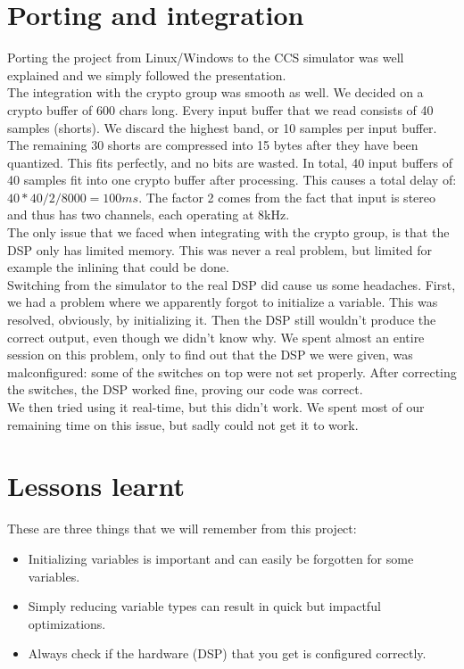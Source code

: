 \documentclass[a4paper]{article}
\begin{document}
\section{Porting and integration}
Porting the project from Linux/Windows to the CCS simulator was well explained and we simply followed the presentation. \\

The integration with the crypto group was smooth as well. We decided on a crypto buffer of 600 chars long. Every input buffer that we read consists of 40 samples (shorts). We discard the highest band, or 10 samples per input buffer. The remaining 30 shorts are compressed into 15 bytes after they have been quantized. This fits perfectly, and no bits are wasted. In total, 40 input buffers of 40 samples fit into one crypto buffer after processing. This causes a total delay of: $40*40/2/8000 = 100ms$. The factor 2 comes from the fact that input is stereo and thus has two channels, each operating at 8kHz. \\
The only issue that we faced when integrating with the crypto group, is that the DSP only has limited memory. This was never a real problem, but limited for example the inlining that could be done. \\
Switching from the simulator to the real DSP did cause us some headaches. First, we had a problem where we apparently forgot to initialize a variable. This was resolved, obviously, by initializing it. Then the DSP still wouldn't produce the correct output, even though we didn't know why. We spent almost an entire session on this problem, only to find out that the DSP we were given, was malconfigured: some of the switches on top were not set properly. After correcting the switches, the DSP worked fine, proving our code was correct. \\
We then tried using it real-time, but this didn't work. We spent most of our remaining time on this issue, but sadly could not get it to work.

\section{Lessons learnt}
These are three things that we will remember from this project:
\begin{itemize}
\item Initializing variables is important and can easily be forgotten for some variables.
\item Simply reducing variable types can result in quick but impactful optimizations.
\item Always check if the hardware (DSP) that you get is configured correctly.
\end{itemize}
\end{document}
